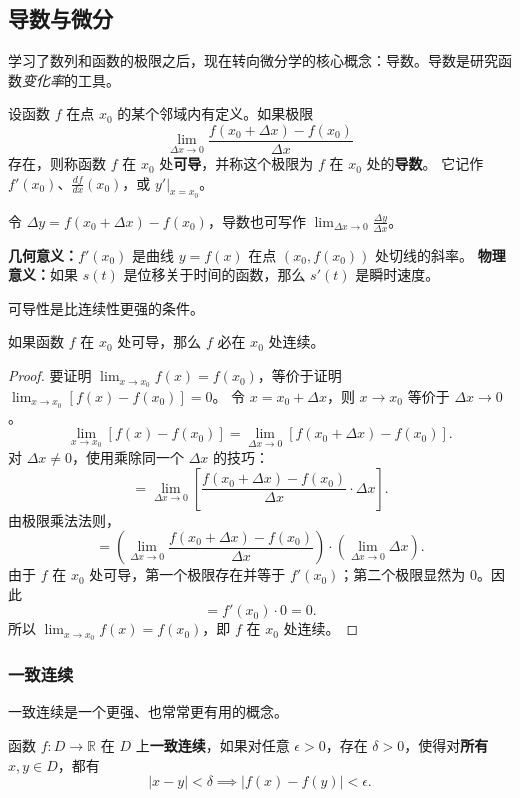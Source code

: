 \subsection{导数与微分}

学习了数列和函数的极限之后，现在转向微分学的核心概念：导数。导数是研究函数\textit{变化率}的工具。

\begin{definition}[导数]
设函数 $f$ 在点 $x_0$ 的某个邻域内有定义。如果极限
\[
\lim_{\Delta x\to 0}\frac{f(x_0+\Delta x)-f(x_0)}{\Delta x}
\]
存在，则称函数 $f$ 在 $x_0$ 处\textbf{可导}，并称这个极限为 $f$ 在 $x_0$ 处的\textbf{导数}。
它记作 $f'(x_0)$、$\frac{df}{dx}(x_0)$，或 $y'|_{x=x_0}$。

令 $\Delta y=f(x_0+\Delta x)-f(x_0)$，导数也可写作 $\lim_{\Delta x\to 0}\frac{\Delta y}{\Delta x}$。
\end{definition}

\textbf{几何意义：}$f'(x_0)$ 是曲线 $y=f(x)$ 在点 $(x_0,f(x_0))$ 处切线的斜率。
\textbf{物理意义：}如果 $s(t)$ 是位移关于时间的函数，那么 $s'(t)$ 是瞬时速度。

可导性是比连续性更强的条件。

\begin{theorem}[可导推出连续]
如果函数 $f$ 在 $x_0$ 处可导，那么 $f$ 必在 $x_0$ 处连续。
\end{theorem}

\begin{proof}
要证明 $\lim_{x\to x_0}f(x)=f(x_0)$，等价于证明 $\lim_{x\to x_0}[f(x)-f(x_0)]=0$。
令 $x=x_0+\Delta x$，则 $x\to x_0$ 等价于 $\Delta x\to 0$。
\[
\lim_{x\to x_0}[f(x)-f(x_0)]=\lim_{\Delta x\to 0}[f(x_0+\Delta x)-f(x_0)].
\]
对 $\Delta x\ne 0$，使用乘除同一个 $\Delta x$ 的技巧：
\[
=\lim_{\Delta x\to 0}\left[\frac{f(x_0+\Delta x)-f(x_0)}{\Delta x}\cdot \Delta x\right].
\]
由极限乘法法则，
\[
=\left(\lim_{\Delta x\to 0}\frac{f(x_0+\Delta x)-f(x_0)}{\Delta x}\right)\cdot \left(\lim_{\Delta x\to 0}\Delta x\right).
\]
由于 $f$ 在 $x_0$ 处可导，第一个极限存在并等于 $f'(x_0)$；第二个极限显然为 $0$。因此
\[
=f'(x_0)\cdot 0=0.
\]
所以 $\lim_{x\to x_0}f(x)=f(x_0)$，即 $f$ 在 $x_0$ 处连续。
\end{proof}

\subsubsection{一致连续}
一致连续是一个更强、也常常更有用的概念。

\begin{definition}[一致连续]
函数 $f:D\to \mathbb{R}$ 在 $D$ 上\textbf{一致连续}，如果对任意 $\epsilon>0$，存在 $\delta>0$，使得对\textbf{所有} $x,y\in D$，都有
\[
|x-y|<\delta \implies |f(x)-f(y)|<\epsilon.
\]
\end{definition}

